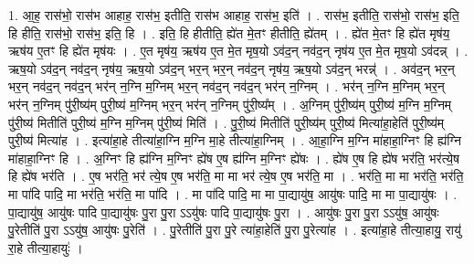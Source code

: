 \documentclass[17pt]{extarticle}
\begin{document}
1. आ॒ह॒ रास॑भो॒ रास॑भ आहाह॒ रास॑भ॒ इतीति॒ रास॑भ आहाह॒ रास॑भ॒ इति॑ । . रास॑भ॒ इतीति॒ रास॑भो॒ रास॑भ॒ इति॒ हि हीति॒ रास॑भो॒ रास॑भ॒ इति॒ हि । . इति॒ हि हीतीति॒ ह्ये॑त मे॒तꣳ हीतीति॒ ह्ये॑तम् । . ह्ये॑त मे॒तꣳ हि ह्ये॑त मृष॑य॒ ऋष॑य ए॒तꣳ हि ह्ये॑त मृष॑यः । . ए॒त मृष॑य॒ ऋष॑य ए॒त मे॒त मृष॒यो ऽव॑द॒न् नव॑द॒न् नृष॑य ए॒त मे॒त मृष॒यो ऽव॑दन्न् । . ऋष॒यो ऽव॑द॒न् नव॑द॒न् नृष॑य॒ ऋष॒यो ऽव॑द॒न् भर॒न् भर॒न् नव॑द॒न् नृष॑य॒ ऋष॒यो ऽव॑द॒न् भरन्न्॑ । . अव॑द॒न् भर॒न् भर॒न् नव॑द॒न् नव॑द॒न् भर॑न् न॒ग्नि म॒ग्निम् भर॒न् नव॑द॒न् नव॑द॒न् भर॑न् न॒ग्निम् । . भर॑न् न॒ग्नि म॒ग्निम् भर॒न् भर॑न् न॒ग्निम् पु॑री॒ष्य॑म् पुरी॒ष्य॑ म॒ग्निम् भर॒न् भर॑न् न॒ग्निम् पु॑री॒ष्य᳚म् । . अ॒ग्निम् पु॑री॒ष्य॑म् पुरी॒ष्य॑ म॒ग्नि म॒ग्निम् पु॑री॒ष्य॑ मितीति॑ पुरी॒ष्य॑ म॒ग्नि म॒ग्निम् पु॑री॒ष्य॑ मिति॑ । . पु॒री॒ष्य॑ मितीति॑ पुरी॒ष्य॑म् पुरी॒ष्य॑ मित्या॑हा॒हेति॑ पुरी॒ष्य॑म् पुरी॒ष्य॑ मित्या॑ह । . इत्या॑हा॒हे तीत्या॑हा॒ग्नि म॒ग्नि मा॒हे तीत्या॑हा॒ग्निम् । . आ॒हा॒ग्नि म॒ग्नि मा॑हाहा॒ग्निꣳ हि ह्य॑ग्नि मा॑हाहा॒ग्निꣳ हि । . अ॒ग्निꣳ हि ह्य॑ग्नि म॒ग्निꣳ ह्ये॑ष ए॒ष ह्य॑ग्नि म॒ग्निꣳ ह्ये॑षः । . ह्ये॑ष ए॒ष हि ह्ये॑ष भर॑ति॒ भर॑त्ये॒ष हि ह्ये॑ष भर॑ति । . ए॒ष भर॑ति॒ भर॑ त्ये॒ष ए॒ष भर॑ति॒ मा मा भर॑ त्ये॒ष ए॒ष भर॑ति॒ मा । . भर॑ति॒ मा मा भर॑ति॒ भर॑ति॒ मा पा॑दि पादि॒ मा भर॑ति॒ भर॑ति॒ मा पा॑दि । . मा पा॑दि पादि॒ मा मा पा॒द्यायु॑ष॒ आयु॑षः पादि॒ मा मा पा॒द्यायु॑षः । . पा॒द्यायु॑ष॒ आयु॑षः पादि पा॒द्यायु॑षः पु॒रा पु॒रा ऽऽयु॑षः पादि पा॒द्यायु॑षः पु॒रा । . आयु॑षः पु॒रा पु॒रा ऽऽयु॑ष॒ आयु॑षः पु॒रेतीति॑ पु॒रा ऽऽयु॑ष॒ आयु॑षः पु॒रेति॑ । . पु॒रेतीति॑ पु॒रा पु॒रे त्या॑हा॒हेति॑ पु॒रा पु॒रेत्या॑ह । . इत्या॑हा॒हे तीत्या॒हायु॒ रायु॑ रा॒हे तीत्या॒हायुः॑ । \newline
\end{document}
